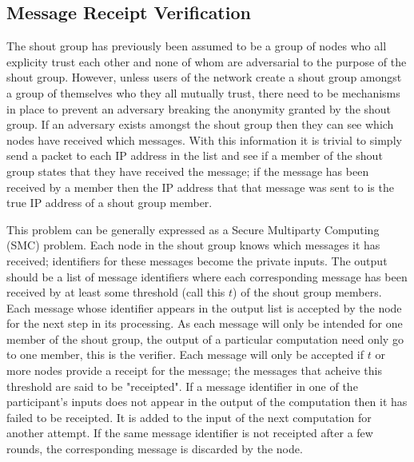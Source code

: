 \documentclass[ %
                    author={Luke Murray},
                supervisor={Dr. Simon Hollis},
                     title={Shadow Peer-to-Peer Networks},
                  subtitle={},
                    degree={MEng},
                      year={2013} ]{thesis}
\begin{document}
\subsection{Message Receipt Verification}

The shout group has previously been assumed to be a group of nodes who all explicity trust each other and none of whom are adversarial to the purpose of the shout group. However, unless users of the network create a shout group amongst a group of themselves who they all mutually trust, there need to be mechanisms in place to prevent an adversary breaking the anonymity granted by the shout group. If an adversary exists amongst the shout group then they can see which nodes have received which messages. With this information it is trivial to simply send a packet to each IP address in the list and see if a member of the shout group states that they have received the message; if the message has been received by a member then the IP address that that message was sent to is the true IP address of a shout group member.

This problem can be generally expressed as a Secure Multiparty Computing (SMC) problem. Each node in the shout group knows which messages it has received; identifiers for these messages become the private inputs. The output should be a list of message identifiers where each corresponding message has been received by at least some threshold (call this $t$) of the shout group members. Each message whose identifier appears in the output list is accepted by the node for the next step in its processing. As each message will only be intended for one member of the shout group, the output of a particular computation need only go to one member, this is the verifier. Each message will only be accepted if $t$ or more nodes provide a receipt for the message; the messages that acheive this threshold are said to be "receipted". If a message identifier in one of the participant's inputs does not appear in the output of the computation then it has failed to be receipted. It is added to the input of the next computation for another attempt. If the same message identifier is not receipted after a few rounds, the corresponding message is discarded by the node.
\end{document}
